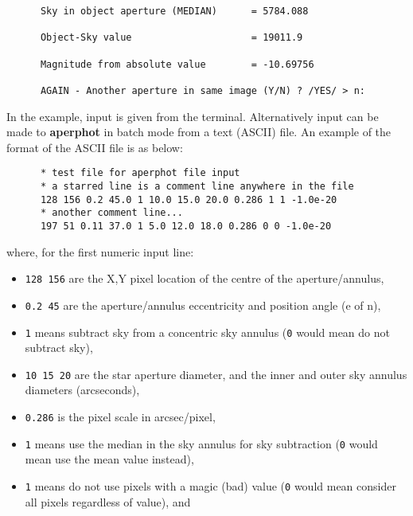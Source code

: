 \begin{description}
\begin{small}
\begin{verbatim}
      Sky in object aperture (MEDIAN)      = 5784.088
 
      Object-Sky value                     = 19011.9
 
      Magnitude from absolute value        = -10.69756
 
      AGAIN - Another aperture in same image (Y/N) ? /YES/ > n:
\end{verbatim}
\end{small}

In the example, input is given from the terminal.  Alternatively input
can be made to {\bf aperphot} in batch mode from a text (ASCII) file.  An
example of the format of the ASCII file is as below:

\begin{small}
\begin{verbatim}
      * test file for aperphot file input
      * a starred line is a comment line anywhere in the file
      128 156 0.2 45.0 1 10.0 15.0 20.0 0.286 1 1 -1.0e-20
      * another comment line...
      197 51 0.11 37.0 1 5.0 12.0 18.0 0.286 0 0 -1.0e-20
\end{verbatim}
\end{small}

where, for the first numeric input line: 

\begin{itemize}

\item {\tt 128 156} are the X,Y pixel location of the centre of the
aperture/annulus,

\item {\tt 0.2 45} are the aperture/annulus eccentricity and position
angle (e of n),

\item {\tt 1} means subtract sky from a concentric sky annulus ({\tt 0}
would mean do not subtract sky),

\item {\tt 10 15 20} are the star aperture diameter, and the inner and
outer sky annulus diameters (arcseconds),

\item {\tt 0.286} is the pixel scale in arcsec/pixel,

\item {\tt 1} means use the median in the sky annulus for sky
subtraction ({\tt 0} would mean use the mean value instead),

\item {\tt 1} means do not use pixels with a magic (bad) value ({\tt 0}
would mean consider all pixels regardless of value), and


\end{itemize}
\end{description}
